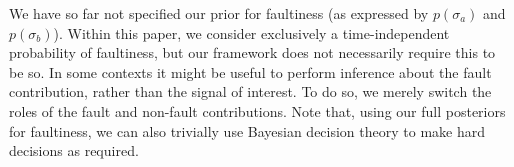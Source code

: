 \documentclass{article} %
\newcommand{\psff}[1]{\texttt{[image: \#1.eps]}}
\begin{document}
We have so far not specified our prior for faultiness (as expressed by
$p(\sigma_a)$ and $p(\sigma_b)$). Within this paper, we consider
exclusively a time-independent probability of faultiness, but our framework does not necessarily require this to be so. In some contexts it might be useful to perform inference about the
fault contribution, rather than the signal of interest.  To do so, we merely switch the roles of the fault and non-fault
contributions. Note that, using our full posteriors for faultiness, we
can also trivially use Bayesian decision theory to make hard decisions
as required.

\end{document}
